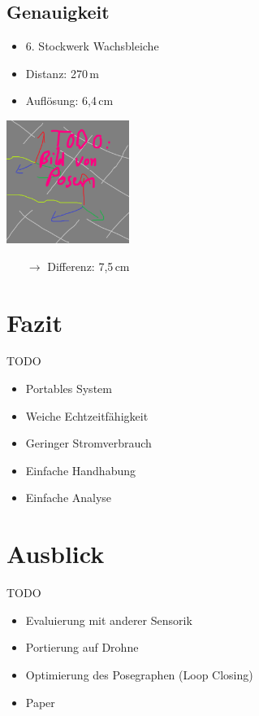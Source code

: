\documentclass{beamer}
\begin{document}
\subsection{Genauigkeit}
\begin{frame}{\subsecname}
\begin{itemize}
\item{6. Stockwerk Wachsbleiche}
\item{Distanz: 270\,m}
\item{Auflösung: 6,4\,cm}
\end{itemize}
\begin{center}
\includegraphics[width=4cm]{images/pose_difference.png}
\end{center}
\begin{itemize}
\item[$\rightarrow$]{Differenz: 7,5\,cm}
\end{itemize}
\end{frame}

\section*{Fazit}
\begin{frame}{\secname}
TODO
\begin{itemize}
\item{Portables System}
\item{Weiche Echtzeitfähigkeit}
\item{Geringer Stromverbrauch}
\item{Einfache Handhabung}
\item{Einfache Analyse}
\end{itemize}   
\end{frame}

\section*{Ausblick}
\begin{frame}{\secname}
TODO
\begin{itemize}
\item Evaluierung mit anderer Sensorik
\item Portierung auf Drohne
\item Optimierung des Posegraphen (Loop Closing)
\item Paper
\end{itemize}
\end{frame}
\end{document}
